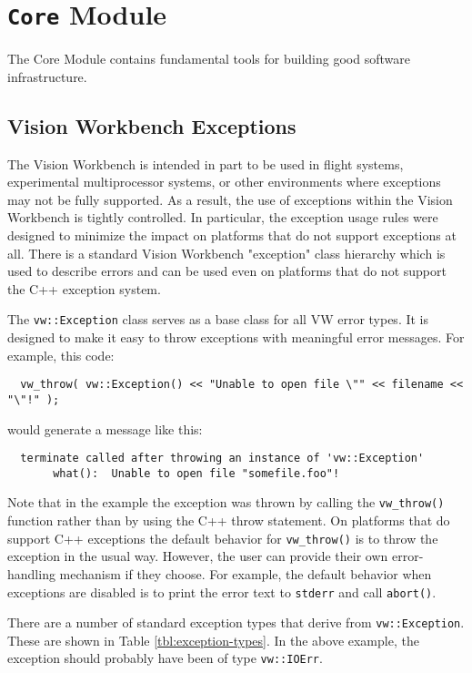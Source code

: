 \chapter{{\tt Core} Module}
\label{ch:core-module}

The Core Module contains fundamental tools for building good software infrastructure.

 \section{Vision Workbench Exceptions}
\label{sec:exceptions}

The Vision Workbench is intended in part to be used in flight systems,
experimental multiprocessor systems, or other environments where
exceptions may not be fully supported.  As a result, the use of
exceptions within the Vision Workbench is tightly controlled.  In
particular, the exception usage rules were designed to minimize the
impact on platforms that do not support exceptions at all.  There is a
standard Vision Workbench "exception" class hierarchy which is used to
describe errors and can be used even on platforms that do not support
the C++ exception system.

The \verb#vw::Exception# class serves as a base class for all VW error
types.  It is designed to make it easy to throw exceptions with
meaningful error messages.  For example, this code:

\begin{verbatim}
  vw_throw( vw::Exception() << "Unable to open file \"" << filename << "\"!" );
\end{verbatim}

would generate a message like this:

\begin{verbatim}
  terminate called after throwing an instance of 'vw::Exception'
       what():  Unable to open file "somefile.foo"!
\end{verbatim}

Note that in the example the exception was thrown by calling the
\verb#vw_throw()# function rather than by using the C++ throw
statement.  On platforms that do support C++ exceptions the default
behavior for \verb#vw_throw()# is to throw the exception in the usual
way.  However, the user can provide their own error-handling mechanism
if they choose.  For example, the default behavior when exceptions are
disabled is to print the error text to \verb#stderr# and call
\verb#abort()#.

There are a number of standard exception types that derive from
\verb#vw::Exception#.  These are shown in Table
\ref{tbl:exception-types}.  In the above example, the exception should
probably have been of type \verb#vw::IOErr#.

